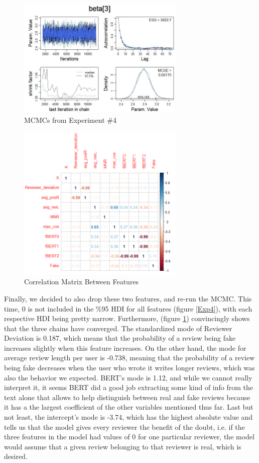 \documentclass[man, floatsintext, 10pt]{apa6}
\begin{document}
\begin{figure}
\includegraphics[width=8cm]{BERTExp4.jpg}
\caption{MCMCs from Experiment \#4}
  \label{Exp4MCMC}
\end{figure}

\begin{figure}
\includegraphics[width=8cm]{corrplot.png}
\caption{Correlation Matrix Between Features}
  \label{corr}
\end{figure}


Finally, we decided to also drop these two features, and re-run the MCMC. This time,  0 is not included in the \%95 HDI for all features (figure \ref{Exp4}), with each respective HDI being pretty narrow. Furthermore, (figure \ref{Exp4MCMC}) convincingly shows that the three chains have converged.  The standardized  mode of Reviewer Deviation is 0.187, which means that the probability of a review being fake increases slightly when this feature increases. On the other hand, the mode for average review length per user is -0.738, meaning that the probability of a review being fake decreases when the user who wrote it writes longer reviews, which was also the behavior we expected. BERT's mode is 1.12, and while we cannot really interpret it, it seems BERT did a good job extracting some kind of info from the text alone that allows to help distinguish between real and fake reviews because it has a the largest coefficient of the other variables mentioned thus far. Last but not least, the intercept's mode is -3.74, which has the highest absolute value and tells us that the model gives every reviewer the benefit of the doubt, i.e. if the three features in the model had values of 0 for one particular reviewer, the model would assume that a given review belonging to that reviewer is real, which is desired.
\end{document}
